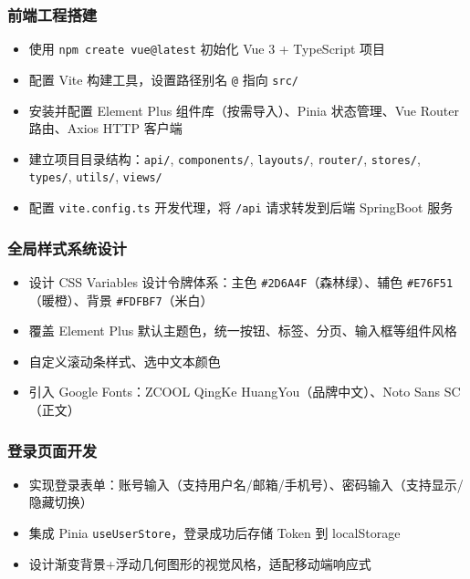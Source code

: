 \documentclass[12pt,a4paper]{ctexart}
\begin{document}
\subsubsection*{前端工程搭建}
\begin{itemize}
    \item 使用 \texttt{npm create vue@latest} 初始化 Vue 3 + TypeScript 项目
    \item 配置 Vite 构建工具，设置路径别名 \texttt{@} 指向 \texttt{src/}
    \item 安装并配置 Element Plus 组件库（按需导入）、Pinia 状态管理、Vue Router 路由、Axios HTTP 客户端
    \item 建立项目目录结构：\texttt{api/}, \texttt{components/}, \texttt{layouts/}, \texttt{router/}, \texttt{stores/}, \texttt{types/}, \texttt{utils/}, \texttt{views/}
    \item 配置 \texttt{vite.config.ts} 开发代理，将 \texttt{/api} 请求转发到后端 SpringBoot 服务
\end{itemize}

\subsubsection*{全局样式系统设计}
\begin{itemize}
    \item 设计 CSS Variables 设计令牌体系：主色 \texttt{\#2D6A4F}（森林绿）、辅色 \texttt{\#E76F51}（暖橙）、背景 \texttt{\#FDFBF7}（米白）
    \item 覆盖 Element Plus 默认主题色，统一按钮、标签、分页、输入框等组件风格
    \item 自定义滚动条样式、选中文本颜色
    \item 引入 Google Fonts：ZCOOL QingKe HuangYou（品牌中文）、Noto Sans SC（正文）
\end{itemize}

\subsubsection*{登录页面开发}
\begin{itemize}
    \item 实现登录表单：账号输入（支持用户名/邮箱/手机号）、密码输入（支持显示/隐藏切换）
    \item 集成 Pinia \texttt{useUserStore}，登录成功后存储 Token 到 localStorage
    \item 设计渐变背景+浮动几何图形的视觉风格，适配移动端响应式
\end{itemize}
\end{document}
